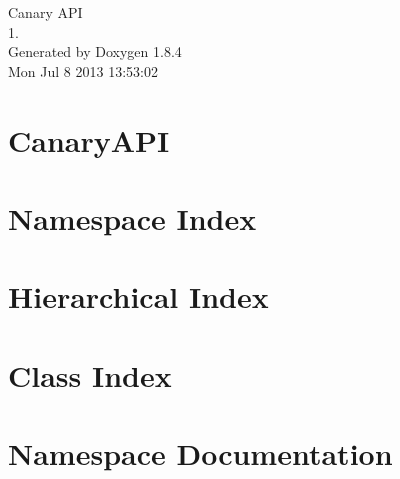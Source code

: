 \documentclass[twoside]{book}
\newcommand{\clearemptydoublepage}{%
  \newpage{\pagestyle{empty}\cleardoublepage}%
}
\begin{document}
\hypersetup{pageanchor=false}
\begin{titlepage}
\vspace*{7cm}
\begin{center}%
{\Large Canary A\-P\-I \\[1ex]\large 1. }\\
\vspace*{1cm}
{\large Generated by Doxygen 1.8.4}\\
\vspace*{0.5cm}
{\small Mon Jul 8 2013 13:53:02}\\
\end{center}
\end{titlepage}
\clearemptydoublepage
\tableofcontents
\clearemptydoublepage
{}
\hypersetup{pageanchor=true}

\chapter{Canary\-A\-P\-I}
\label{md_README}
\hypertarget{md_README}{}

\chapter{Namespace Index}

\chapter{Hierarchical Index}

\chapter{Class Index}

\chapter{Namespace Documentation}















\end{document}
